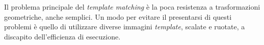 Il problema principale del \textit{template matching} \`e la poca resistenza a trasformazioni geometriche, anche semplici. Un modo per evitare il presentarsi di questi problemi \`e quello di utilizzare diverse immagini \textit{template}, scalate e ruotate, a discapito dell'efficienza di esecuzione.
\begin{figure}[H]
	\centering
\end{figure}
